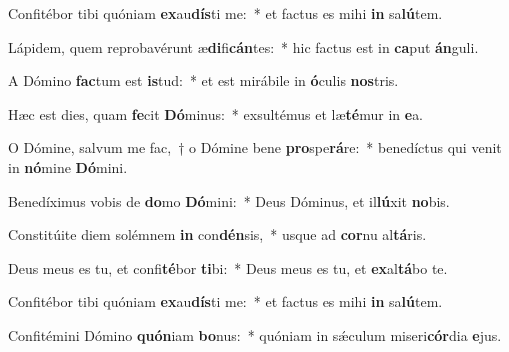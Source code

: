 \item Confitébor tibi quóniam \textbf{ex}au\textbf{dís}ti me:~* et factus es mihi \textbf{in} sa\textbf{lú}tem.
\item Lápidem, quem reprobavérunt æ\textbf{di}fi\textbf{cán}tes:~* hic factus est in \textbf{ca}put \textbf{án}guli.
\item A Dómino \textbf{fac}tum est \textbf{is}tud:~* et est mirábile in \textbf{ó}culis \textbf{nos}tris.
\item Hæc est dies, quam \textbf{fe}cit \textbf{Dó}minus:~* exsultémus et læ\textbf{té}mur in \textbf{e}a.
\item O Dómine, salvum me fac,~† o Dómine bene \textbf{pro}spe\textbf{rá}re:~* benedíctus qui venit in \textbf{nó}mine \textbf{Dó}mini.
\item Benedíximus vobis de \textbf{do}mo \textbf{Dó}mini:~* Deus Dóminus, et il\textbf{lú}xit \textbf{no}bis.
\item Constitúite diem solémnem \textbf{in} con\textbf{dén}sis,~* usque ad \textbf{cor}nu al\textbf{tá}ris.
\item Deus meus es tu, et confi\textbf{té}bor \textbf{ti}bi:~* Deus meus es tu, et \textbf{ex}al\textbf{tá}bo te.
\item Confitébor tibi quóniam \textbf{ex}au\textbf{dís}ti me:~* et factus es mihi \textbf{in} sa\textbf{lú}tem.
\item Confitémini Dómino \textbf{quón}iam \textbf{bo}nus:~* quóniam in sǽculum miseri\textbf{cór}dia \textbf{e}jus.
